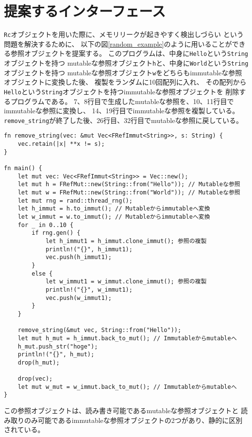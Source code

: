 \documentclass{sumiilab-paper}
\theoremstyle{mystyle}
\numberwithin{definition}{chapter} %
\begin{document}
\section{提案するインターフェース}
\texttt{Rc}オブジェクトを用いた際に、メモリリークが起きやすく検出しづらい
という問題を解決するために、
以下の図\ref{random_example}のように用いることができる参照オブジェクトを提案する。
このプログラムは、中身に\texttt{Hello}という\texttt{String}オブジェクトを持つ
mutableな参照オブジェクト\texttt{h}と、中身に\texttt{World}という\texttt{String}オブジェクトを持つ
mutableな参照オブジェクト\texttt{w}をどちらもimmutableな参照オブジェクトに変換した後、
複製をランダムに10回配列に入れ、
その配列から\texttt{Hello}という\texttt{String}オブジェクトを持つimmutableな参照オブジェクトを
削除するプログラムである。
7、8行目で生成したmutableな参照を、10、11行目でimmutableな参照に変換し、
14、19行目でimmutableな参照を複製している。
\texttt{remove\_string}が終了した後、26行目、32行目でmutableな参照に戻している。
\begin{lstlisting}[caption=新たな参照オブジェクトを用いた柔軟なメモリ管理の例, 
  label=random_example, captionpos=b]
fn remove_string(vec: &mut Vec<FRefImmut<String>>, s: String) {
    vec.retain(|x| **x != s);
}

fn main() {
    let mut vec: Vec<FRefImmut<String>> = Vec::new();
    let mut h = FRefMut::new(String::from("Hello")); // Mutableな参照
    let mut w = FRefMut::new(String::from("World")); // Mutableな参照
    let mut rng = rand::thread_rng();
    let h_immut = h.to_immut(); // Mutableからimmutableへ変換
    let w_immut = w.to_immut(); // Mutableからimmutableへ変換
    for _ in 0..10 {
        if rng.gen() {
            let h_immut1 = h_immut.clone_immut(); 参照の複製
            println!("{}", h_immut1);
            vec.push(h_immut1);
        }
        else {
            let w_immut1 = w_immut.clone_immut(); 参照の複製
            println!("{}", w_immut1);
            vec.push(w_immut1);
        }
    }

    remove_string(&mut vec, String::from("Hello"));
    let mut h_mut = h_immut.back_to_mut(); // Immutableからmutableへ
    h_mut.push_str("hoge");
    println!("{}", h_mut);
    drop(h_mut);

    drop(vec);
    let mut w_mut = w_immut.back_to_mut(); // Immutableからmutableへ
}
\end{lstlisting}
この参照オブジェクトは、読み書き可能であるmutableな参照オブジェクトと
読み取りのみ可能であるimmutableな参照オブジェクトの2つがあり、静的に区別されている。
\end{document}
